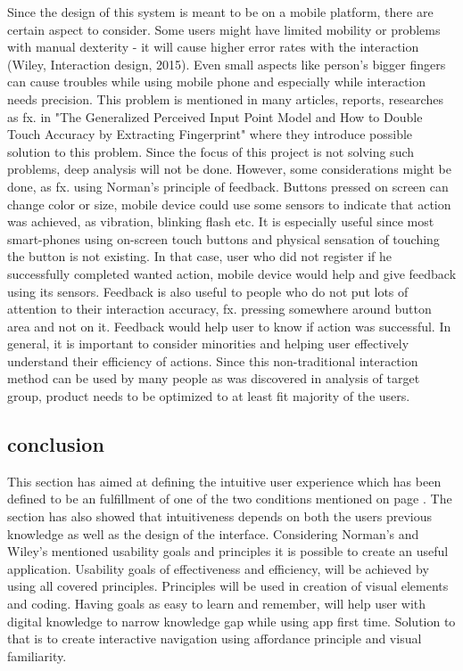 Since the design of this system is meant to be on a mobile platform, there are certain aspect to consider. Some users might have limited mobility or problems with manual dexterity - it will cause higher error rates with the interaction (Wiley, Interaction design, 2015). Even small aspects like person's bigger fingers can cause troubles while using mobile phone and especially while interaction needs precision. This problem is mentioned in many articles, reports, researches as fx. in "The Generalized Perceived Input Point Model and How to Double Touch Accuracy by Extracting Fingerprint" where they introduce possible solution to this problem. Since the focus of this project is not solving such problems, deep analysis will not be done. However, some considerations might be done, as fx. using Norman's principle of feedback. Buttons pressed on screen can change color or size, mobile device could use some sensors to indicate that action was achieved, as vibration, blinking flash etc. It is especially useful since most smart-phones using on-screen touch buttons and physical sensation of touching the button is not existing.  In that case, user who did not register if he successfully completed wanted action, mobile device would help and give feedback using its sensors. Feedback is also useful to people who do not put lots of attention to their interaction accuracy, fx. pressing somewhere around button area and not on it. Feedback would help user to know if action was successful. 
In general, it is important to consider minorities and helping user effectively understand their efficiency of actions. Since this non-traditional interaction method can be used by many people as was discovered in analysis of target group, product needs to be optimized to at least fit majority of the users. 

\subsection{conclusion}
This section has aimed at defining the intuitive user experience which has been defined to be an fulfillment of one of the two conditions mentioned on page \pageref{intuitiveConditions}. The section has also showed that intuitiveness depends on both the users previous knowledge as well as the design of the interface. Considering Norman's and Wiley's mentioned usability goals and principles it is 
possible to create an useful application. Usability goals of effectiveness and 
efficiency, will be achieved by using all covered principles. Principles will be 
used in creation of visual elements and coding. Having goals as easy to learn and 
remember, will help user with digital knowledge to narrow knowledge gap while 
using app first time. Solution to that is to create interactive navigation using 
affordance principle and visual familiarity.
